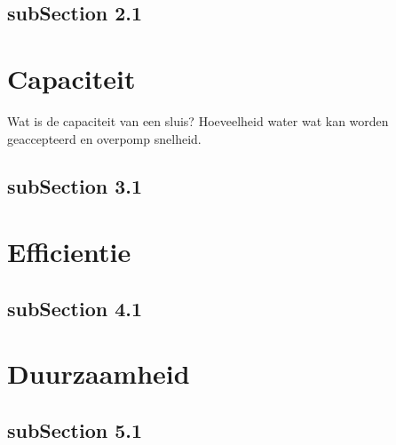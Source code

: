 \documentclass{article}
\begin{document}
\subsection{subSection 2.1}

\section{Capaciteit}
Wat is de capaciteit van een sluis? Hoeveelheid water wat kan worden geaccepteerd en overpomp snelheid.
\subsection{subSection 3.1}

\section{Efficientie}
\subsection{subSection 4.1}

\section{Duurzaamheid}
\subsection{subSection 5.1}



\newpage

\newpage


\end{document}
